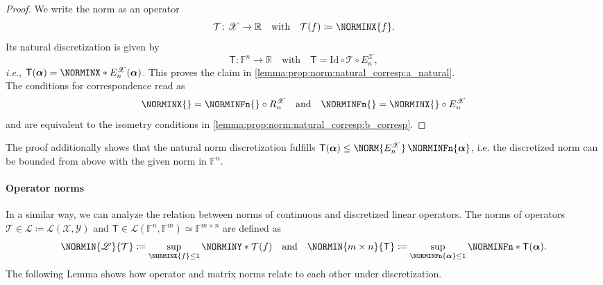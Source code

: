 \documentclass[a4paper]{paper}
\newcommand*{\SPC}[1]{{\ensuremath{\mathscr{#1}}}}
\newcommand*{\SPCL}{\SPC{L}}
\newcommand*{\SPCX}{\SPC{X}}
\newcommand*{\SPCY}{\SPC{Y}}
\newcommand*{\BLINOP}[2]{{\SPCL(#1, #2)}}
\newcommand{\FIELD}{{\ensuremath{\mathbb{F}}}}
\newcommand*{\Fn}{{\ensuremath{\FIELD^n}}}
\newcommand*{\Fm}{{\ensuremath{\FIELD^m}}}
\newcommand*{\Fmxn}{{\ensuremath{\FIELD^{m \times n}}}}
\newcommand{\Real}{\mathbb{R}}
\newcommand*{\OP}[1]{{\ensuremath{\mathcal{#1}}}}
\newcommand*{\OPT}{\OP{T}}
\newcommand*{\OPID}{\OP{\mathrm{Id}}}
\newcommand{\DISCOP}[1]{{\ensuremath{\mathsf{#1}}}}
\newcommand*{\DISCOPT}{\DISCOP{T}}
\newcommand*{\EXT}[2]{\ensuremath{E_{#1}^{#2}}}
\newcommand*{\REST}[2]{\ensuremath{R_{#1}^{#2}}}
\newcommand*{\RnX}{{\ensuremath{\REST{n}{\SPC{X}}}}}
\newcommand*{\EnX}{{\ensuremath{\EXT{n}{\SPC{X}}}}}
\newcommand{\ie}{\textsl{i.e.}\xspace}
\newcommand{\valpha}{\boldsymbol{\alpha}}
\begin{document}
\begin{proof}
 We write the norm as an operator
 \begin{equation*}
  \OPT \colon \SPCX \to \Real \quad \text{with} \quad \OPT(f) \coloneqq  \NORMINX{f}.
 \end{equation*}
 Its natural discretization is given by
 \begin{equation*}
  \DISCOPT \colon \Fn \to \Real \quad \text{with} \quad \DISCOPT = \OPID \circ \OPT \circ \EnX,
 \end{equation*}
 \ie, $\DISCOPT(\valpha) = \NORMINX*{\EnX(\valpha)}$. This proves the claim in 
 \eqref{lemma:prop:norm:natural_corresp:a_natural}.\\
 The conditions for correspondence read as
 \begin{equation*}
  \NORMINX{} = \NORMINFn{} \circ \RnX
  \quad \text{and} \quad
  \NORMINFn{} = \NORMINX{} \circ \EnX
 \end{equation*}
 and are equivalent to the isometry conditions in \eqref{lemma:prop:norm:natural_corresp:b_corresp}.
\end{proof}

\begin{remark}
 The proof additionally shows that the natural norm discretization fulfills
 $\DISCOPT(\valpha) \leq \NORM{\EnX}\, \NORMINFn{\valpha}$, i.e. the discretized norm can be bounded from above 
 with the given norm in $\Fn$.
\end{remark}


\paragraph{Operator norms}

In a similar way, we can analyze the relation between norms of continuous and discretized linear operators. 
The norms of operators $\OPT \in \SPCL \coloneqq  \BLINOP{\SPCX}{\SPCY}$ and 
$\DISCOPT \in \SPCL(\Fn, \Fm) \simeq \Fmxn$ are defined as
%
\begin{equation*}
 \NORMIN{\SPCL}{\OPT} \coloneqq  \sup_{\NORMINX{f} \leq 1} \NORMINY*{\OPT(f)}
 \quad \text{and} \quad
 \NORMIN{m\times n}{\DISCOPT} \coloneqq  \sup_{\NORMINFn{\valpha} \leq 1} \NORMINFn*{\DISCOPT(\valpha)}.
\end{equation*}
%
The following Lemma shows how operator and matrix norms relate to each other under discretization.
\end{document}
